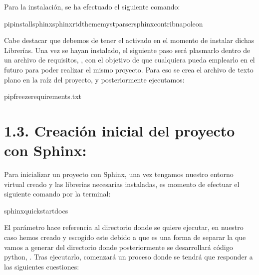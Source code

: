 \documentclass[a4paper,10pt,spanish]{sphinxmanual}
\begin{document}
\sphinxAtStartPar
Para la instalación, se ha efectuado el siguiente comando:

\begin{sphinxVerbatim}[commandchars=\\\{\}]
pipinstallsphinxsphinx\PYGZhy{}rtd\PYGZhy{}thememyst\PYGZhy{}parsersphinxcontrib\PYGZhy{}napoleon
\end{sphinxVerbatim}

\sphinxAtStartPar
Cabe destacar que debemos de tener el  activado en el momento de instalar dichas Librerías. Una vez se hayan instalado, el siguiente paso será plasmarlo dentro de un archivo de requisitos, , con el objetivo de que cualquiera pueda emplearlo en el futuro para poder realizar el mismo proyecto. Para eso se crea el archivo de texto plano en la raíz del proyecto, y posteriormente ejecutamos:

\begin{sphinxVerbatim}[commandchars=\\\{\}]
pipfreeze\PYGZgt{}requirements.txt
\end{sphinxVerbatim}

\sphinxstepscope


\section{1.3. Creación inicial del proyecto con Sphinx:}
\label{\detokenize{1_configuracion_inicial/proyecto_inicial_sphynx:creacion-inicial-del-proyecto-con-sphinx}}\label{\detokenize{1_configuracion_inicial/proyecto_inicial_sphynx::doc}}
\sphinxAtStartPar
Para inicializar un proyecto con Sphinx, una vez tengamos nuestro entorno virtual creado y las librerias necesarias instaladas, es momento de efectuar el siguiente comando por la terminal:

\begin{sphinxVerbatim}[commandchars=\\\{\}]
sphinx\PYGZhy{}quickstartdocs
\end{sphinxVerbatim}

\sphinxAtStartPar
El parámetro  hace referencia al directorio donde se quiere ejecutar, en nuestro caso hemos creado y escogido este debido a que es una forma de separar la  que vamos a generar del directorio donde posteriormente se desarrollará código python, . Tras ejecutarlo, comenzará un proceso donde se tendrá que responder a las siguientes cuestiones:
\end{document}
